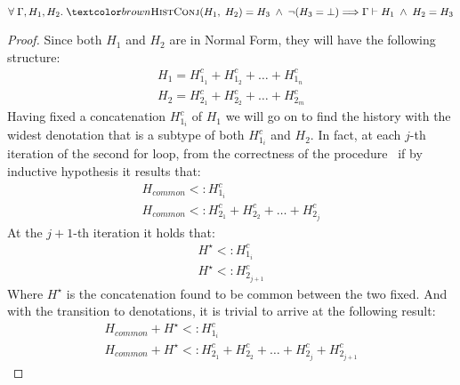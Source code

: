 \begin{theorem}
    \begin{equation*}
        \forall \;\Gamma, H_1, H_2. \;\histconj(H_1, \;H_2) = H_3 \;\land\; \neg(H_3 = \bot) \Longrightarrow \Gamma \vdash H_1 \;\land\;H_2 = H_3
    \end{equation*}
\end{theorem}

\begin{proof}
    Since both $H_1$ and $H_2$ are in Normal Form, they will have the following structure:
    \begin{equation}
        \begin{gathered}
            H_1 = H_{1_1}^c + H_{1_2}^c + \dots + H_{1_n}^c \\
            H_2 = H_{2_1}^c + H_{2_2}^c + \dots + H_{2_m}^c
        \end{gathered}
    \end{equation}
    Having fixed a concatenation $H_{1_i}^c$ of $H_1$ we will go on to find the history with the widest denotation that is a subtype of both $H_{1_i}^c$ and $H_2$.
    In fact, at each $j$-th iteration of the second for loop, from the correctness of the procedure \subconc\, if by inductive hypothesis it results that:
    \begin{equation}
        \begin{gathered}
            H_{common} <: H_{1_i}^c \\
            H_{common} <: H_{2_1}^c + H_{2_2}^c + \dots + H_{2_j}^c
        \end{gathered}
    \end{equation}
    At the $j+1$-th iteration it holds that:
    \begin{equation}
        \begin{gathered}
            H^{\star} <: H_{1_i}^c \\
            H^{\star} <: H_{2_{j+1}}^c
        \end{gathered}
    \end{equation}
    Where $H^{\star}$ is the concatenation found to be common between the two fixed. And with the transition to denotations, it is trivial to arrive at the following result:
    \begin{equation}
        \begin{gathered}
            H_{common} + H^{\star} <: H_{1_i}^c \\
            H_{common} + H^{\star} <: H_{2_1}^c + H_{2_2}^c + \dots + H_{2_j}^c + H_{2_{j+1}}^c

\end{gathered}
\end{equation}
\end{proof}
